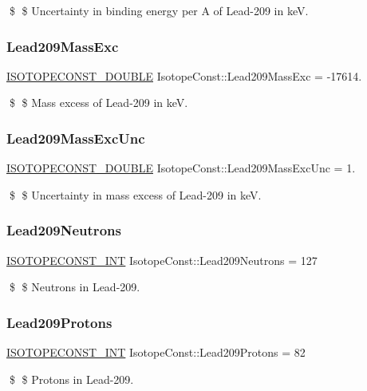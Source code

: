 \$ \$ Uncertainty in binding energy per A of Lead-\/209 in keV. \mbox{\label{group___isotope_const-_lead-_pb209_gaa8b6dfe7f61c1eca94d0c665c425fc21}} 
\subsubsection{\texorpdfstring{Lead209\+Mass\+Exc}{Lead209MassExc}}
{\footnotesize\ttfamily \mbox{\hyperlink{group___isotope_const-_macros_ga8f45a7272ce02c0b4c65c44636ed719a}{I\+S\+O\+T\+O\+P\+E\+C\+O\+N\+S\+T\+\_\+\+D\+O\+U\+B\+LE}} Isotope\+Const\+::\+Lead209\+Mass\+Exc = -\/17614.}

\$ \$ Mass excess of Lead-\/209 in keV. \mbox{\label{group___isotope_const-_lead-_pb209_ga969da8fc0b1ebf9873c7d2709746d17e}} 
\subsubsection{\texorpdfstring{Lead209\+Mass\+Exc\+Unc}{Lead209MassExcUnc}}
{\footnotesize\ttfamily \mbox{\hyperlink{group___isotope_const-_macros_ga8f45a7272ce02c0b4c65c44636ed719a}{I\+S\+O\+T\+O\+P\+E\+C\+O\+N\+S\+T\+\_\+\+D\+O\+U\+B\+LE}} Isotope\+Const\+::\+Lead209\+Mass\+Exc\+Unc = 1.}

\$ \$ Uncertainty in mass excess of Lead-\/209 in keV. \mbox{\label{group___isotope_const-_lead-_pb209_ga5a506f892c6509529b084bbe13d6b903}} 
\subsubsection{\texorpdfstring{Lead209\+Neutrons}{Lead209Neutrons}}
{\footnotesize\ttfamily \mbox{\hyperlink{group___isotope_const-_macros_ga5f18360b3e99483a35c32d789e62621c}{I\+S\+O\+T\+O\+P\+E\+C\+O\+N\+S\+T\+\_\+\+I\+NT}} Isotope\+Const\+::\+Lead209\+Neutrons = 127}

\$ \$ Neutrons in Lead-\/209. \mbox{\label{group___isotope_const-_lead-_pb209_ga98066ad4e552c43efcebcf24bf568a39}} 
\subsubsection{\texorpdfstring{Lead209\+Protons}{Lead209Protons}}
{\footnotesize\ttfamily \mbox{\hyperlink{group___isotope_const-_macros_ga5f18360b3e99483a35c32d789e62621c}{I\+S\+O\+T\+O\+P\+E\+C\+O\+N\+S\+T\+\_\+\+I\+NT}} Isotope\+Const\+::\+Lead209\+Protons = 82}

\$ \$ Protons in Lead-\/209. 